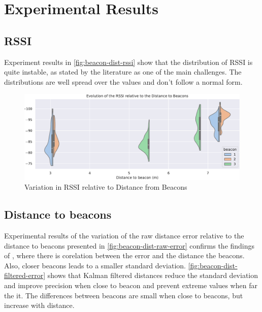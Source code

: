 \chapter{Experimental Results}
\label{chap:implementation}

\section{RSSI}

Experiment results in \autoref{fig:beacon-dist-rssi} show that the distribution of RSSI is quite instable, as stated by the literature as one of the main challenges. The distributions are well spread over the values and don't follow a normal form.

\begin{figure}[h]
    \centering
    \includegraphics[width=\linewidth]{assets/beacon-dist-rssi.pdf}
    \caption{Variation in RSSI relative to Distance from Beacons}
    \label{fig:beacon-dist-rssi}
\end{figure}

\section{Distance to beacons}

Experimental results of the variation of the raw distance error relative to the distance to beacons presented in \autoref{fig:beacon-dist-raw-error} confirms the findings of \cite{spachos_ble_2020}, where there is corelation between the error and the distance the beacons. Also, closer beacons leads to a smaller standard deviation.
 \autoref{fig:beacon-dist-filtered-error} shows that Kalman filtered distances reduce the standard deviation and improve precision when close to beacon and prevent extreme values when far the it. The differences between beacons are small when close to beacons, but increase with distance.

